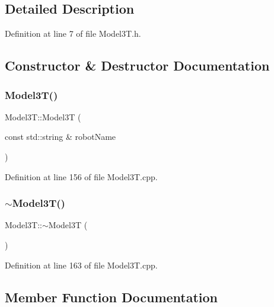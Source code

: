 \subsection{Detailed Description}


Definition at line 7 of file Model3\+T.\+h.



\subsection{Constructor \& Destructor Documentation}
\hypertarget{classModel3T_afbcee4d1130a7020034027aafd9eecf6}{}\label{classModel3T_afbcee4d1130a7020034027aafd9eecf6} 
\subsubsection{\texorpdfstring{Model3\+T()}{Model3T()}}
{\footnotesize\ttfamily Model3\+T\+::\+Model3T (\begin{DoxyParamCaption}\item[{const std\+::string \&}]{robot\+Name }\end{DoxyParamCaption})}



Definition at line 156 of file Model3\+T.\+cpp.

\hypertarget{classModel3T_a6dedc34c9fefff7bd94d7c482eab04d1}{}\label{classModel3T_a6dedc34c9fefff7bd94d7c482eab04d1} 
\subsubsection{\texorpdfstring{$\sim$\+Model3\+T()}{~Model3T()}}
{\footnotesize\ttfamily Model3\+T\+::$\sim$\+Model3T (\begin{DoxyParamCaption}{ }\end{DoxyParamCaption})\hspace{0.3cm}{\ttfamily [virtual]}}



Definition at line 163 of file Model3\+T.\+cpp.



\subsection{Member Function Documentation}
\hypertarget{classModel3T_aabe2edc629d42407da7b45db620854c2}{}\label{classModel3T_aabe2edc629d42407da7b45db620854c2} 
